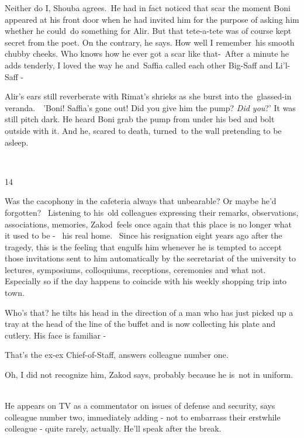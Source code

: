 \documentclass[letterpaper]{article}
\begin{document}
{\textquotedbl}Neither do I,{\textquotedbl} Shouba agrees.\  He had in fact noticed that scar the moment Boni appeared
at his front door when he had invited him for the purpose of asking him whether he could\ do something for Alir. But
that tete-a-tete was of course kept secret from the poet. {\textquotedbl}On the contrary,{\textquotedbl} he says.
{\textquotedbl}How well I remember~his smooth chubby cheeks. Who knows how he ever got a scar like
that{}-{\textquotedbl}\ After a minute he adds tenderly, {\textquotedbl}I loved the way he and~Saffia called each other
Big-Saff and Li'l-Saff -{\textquotedbl}

Alir's ears still reverberate with Rimat's shrieks as she burst into the\ glassed-in veranda.\ \ {}'Boni! Saffia's gone
out! Did you give him the pump? \textit{Did you}?' It was still pitch dark. He heard Boni grab the pump from under his
bed and bolt outside with it. And he, scared to death, turned~to the wall pretending to be asleep.

~

14 

Was the cacophony in the cafeteria always that unbearable? Or maybe he'd forgotten? ~Listening to his~old colleagues
expressing their remarks, observations, associations, memories, Zakod~feels once again that this place is no longer
what it used to be -~ his real home. ~Since his resignation eight years ago after the tragedy, this is the feeling that
engulfs him whenever he is tempted to accept those invitations sent to him automatically by the secretariat of the
university to lectures, symposiums, colloquiums, receptions, ceremonies and what not. Especially so if the day happens
to coincide with his weekly shopping trip into town. 

{\textquotedbl}Who's that?{\textquotedbl} he tilts his head in the direction of a man who has just picked up a tray at
the head of the line of the buffet and is now collecting his plate and cutlery. {\textquotedbl}His face is familiar
-{\textquotedbl} 

{\textquotedbl}That's the ex-ex Chief-of-Staff,{\textquotedbl} answers colleague number one. 

{\textquotedbl}Oh, I did not recognize him,{\textquotedbl} Zakod says, {\textquotedbl}probably because he is~not in
uniform.{\textquotedbl} ~

{\textquotedbl}He appears on TV as a commentator on issues of defense and security,{\textquotedbl} says colleague number
two, immediately adding - not to embarrass their erstwhile colleague - {\textquotedbl}quite rarely, actually. He'll
speak after the break.{\textquotedbl} 
\end{document}
